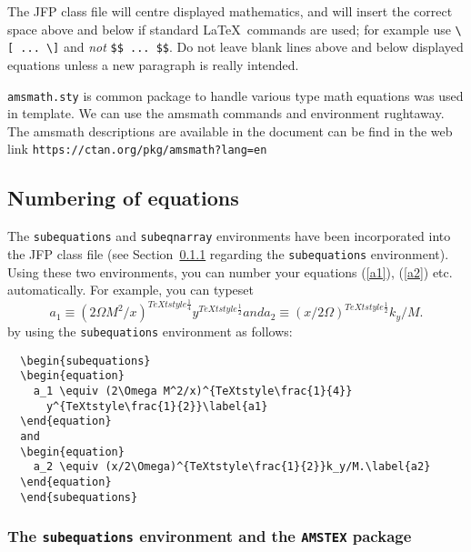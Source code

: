 \documentclass{jfp}
\begin{document}
The JFP class file will centre displayed mathematics, and will insert the
correct space above and below if standard LaTeX\ commands are used; for
example use \verb"\[ ... \]" and \emph{not} \verb"$$ ... $$". Do not leave
blank lines above and below displayed equations unless a new paragraph is
really intended.

\verb"amsmath.sty" is common package to handle various type math equations was used in template. We can use the amsmath commands and environment rughtaway. The amsmath descriptions are available in the document can be find in the web link \verb"https://ctan.org/pkg/amsmath?lang=en"

\subsection{Numbering of equations}

The \verb"subequations" and \verb"subeqnarray" environments have been
incorporated into the JFP class file (see Section~\ref{sub:amstex} regarding
the \verb"subequations" environment). Using these two environments,
you can number your equations (\ref{a1}), (\ref{a2}) etc. automatically.
For example, you can typeset
  \begin{subequations}
  \begin{equation}
    a_1 \equiv (2\Omega M^2/x)^{TeXtstyle\frac{1}{4}}
      y^{TeXtstyle\frac{1}{2}}\label{a1}
  \end{equation}
  and
  \begin{equation}
    a_2 \equiv (x/2\Omega)^{TeXtstyle\frac{1}{2}}k_y/M.\label{a2}
  \end{equation}
  \end{subequations}
by using the \verb"subequations" environment as follows:
%
\begin{verbatim}
  \begin{subequations}
  \begin{equation}
    a_1 \equiv (2\Omega M^2/x)^{TeXtstyle\frac{1}{4}}
      y^{TeXtstyle\frac{1}{2}}\label{a1}
  \end{equation}
  and
  \begin{equation}
    a_2 \equiv (x/2\Omega)^{TeXtstyle\frac{1}{2}}k_y/M.\label{a2}
  \end{equation}
  \end{subequations}
\end{verbatim}

\subsubsection{The \texttt{subequations} environment and the
  \texttt{AMSTEX} package} \label{sub:amstex}
\end{document}
